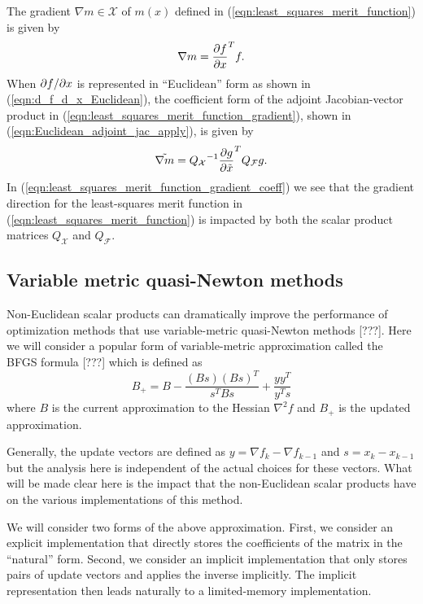 \documentclass[pdf,ps2pdf,11pt]{SANDreport}
\begin{document}
The gradient $\nabla m\in\mathcal{X}$ of $m(x)$ defined in
(\ref{eqn:least_squares_merit_function}) is given by
%
\begin{equation}
\nabla m = \displaystyle{\frac{\partial f}{\partial x}}^T f.
\label{eqn:least_squares_merit_function_gradient}
\end{equation}
%
When $\partial f / \partial x$ is represented in ``Euclidean'' form as shown in
(\ref{eqn:d_f_d_x_Euclidean}), the coefficient form of the adjoint
Jacobian-vector product in (\ref{eqn:least_squares_merit_function_gradient}),
shown in (\ref{eqn:Euclidean_adjoint_jac_apply}), is given by
%
\begin{equation}
\tilde{\nabla m} = {Q_{\mathcal{X}}}^{-1} {\displaystyle{\frac{\partial g}{\partial \tilde{x}}}}^T Q_{\mathcal{F}} g.
\label{eqn:least_squares_merit_function_gradient_coeff}
\end{equation}
%
In (\ref{eqn:least_squares_merit_function_gradient_coeff}) we see that the
gradient direction for the least-squares merit function in
(\ref{eqn:least_squares_merit_function}) is impacted by both the scalar
product matrices $Q_{\mathcal{X}}$ and $Q_{\mathcal{F}}$.

\subsection{Variable metric quasi-Newton methods}
\label{sec:variable_metric_quasi_Newton_methods}

Non-Euclidean scalar products can dramatically improve the performance of
optimization methods that use variable-metric quasi-Newton methods [???].
Here we will consider a popular form of variable-metric approximation called
the BFGS formula [???] which is defined as
%
\[
B_+ = B - \frac{(B s) (B s)^T}{s^T B s} + \frac{y y^T}{y^T s}
\label{eqn:bfgs_update}
\]
%
where $B$ is the current approximation to the Hessian $\nabla^2 f$ and $B_+$
is the updated approximation.

Generally, the update vectors are defined as $y = {}\nabla f_k - {}\nabla
f_{k-1}$ and $s = x_k - x_{k-1}$ but the analysis here is independent of the
actual choices for these vectors.  What will be made clear here is the impact
that the non-Euclidean scalar products have on the various implementations of
this method.

We will consider two forms of the above approximation.  First, we consider an
explicit implementation that directly stores the coefficients of the matrix in
the ``natural'' form.  Second, we consider an implicit implementation that
only stores pairs of update vectors and applies the inverse implicitly.  The
implicit representation then leads naturally to a limited-memory
implementation.
\end{document}
